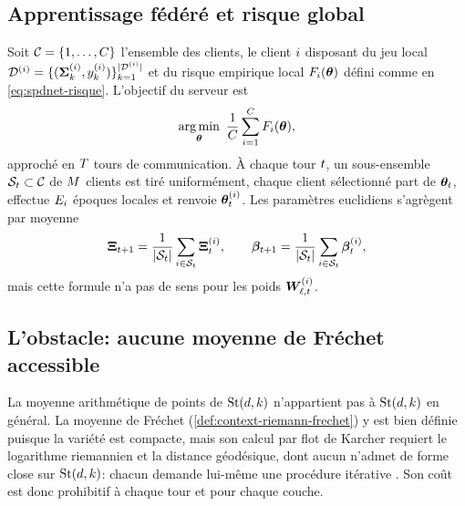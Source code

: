 \subsection{Apprentissage fédéré et risque global}
\label{sec:spdnet-federe-probleme}

Soit $\mathcal{C}=\{1,\dots,C\}$ l'ensemble des clients, le client
$i$ disposant du jeu local
$\mathcal{D}^{(i)}=\{(\boldsymbol{\Sigma}_k^{(i)},y_k^{(i)})\}_{k=1}^{|\mathcal{D}^{(i)}|}$
et du risque empirique local $F_i(\boldsymbol{\theta})$ défini comme en
\cref{eq:spdnet-risque}. L'objectif du serveur est
\begin{equation}
  \argmin_{\netparam}\ \frac{1}{\Nclient}\sum_{\iclient=1}^{\Nclient}\riskloc_\iclient(\netparam),
  \label{eq:spdnet-federe-risque}
\end{equation}
approché en $T$ tours de communication. À chaque tour $t$, un
sous-ensemble $\mathcal{S}_t\subset\mathcal{C}$ de $M$ clients est
tiré uniformément, chaque client sélectionné part de $\boldsymbol{\theta}_t$,
effectue $E_i$ époques locales et renvoie
$\boldsymbol{\theta}_t^{(i)}$. Les paramètres euclidiens s'agrègent par
moyenne 
\begin{equation}
  \boldsymbol{\Xi}_{t+1}=\frac{1}{|\mathcal{S}_t|}\sum_{i\in\mathcal{S}_t}\boldsymbol{\Xi}_t^{(i)},
  \qquad
  \boldsymbol{\beta}_{t+1}=\frac{1}{|\mathcal{S}_t|}\sum_{i\in\mathcal{S}_t}\boldsymbol{\beta}_t^{(i)},
  \label{eq:spdnet-federe-euclidien}
\end{equation}
mais cette formule n'a pas de sens pour les poids $\boldsymbol{W}_{\ell,t}^{(i)}$.

\subsection{L'obstacle: aucune moyenne de Fréchet accessible}
\label{sec:spdnet-federe-obstacle}

\begin{property}
\label{prop:spdnet-federe-obstacle}
  La moyenne arithmétique de points de $\mathrm{St}(d,k)$ n'appartient pas à
  $\mathrm{St}(d,k)$ en général. La moyenne de Fréchet
  (\cref{def:context-riemann-frechet}) y est bien définie puisque la variété est
  compacte, mais son calcul par flot de Karcher requiert le logarithme
  riemannien et la distance géodésique, dont aucun n'admet de forme close sur
  $\mathrm{St}(d,k)$: chacun demande lui-même une procédure itérative
  . Son coût est donc
  prohibitif à chaque tour et pour chaque couche.
\end{property}

